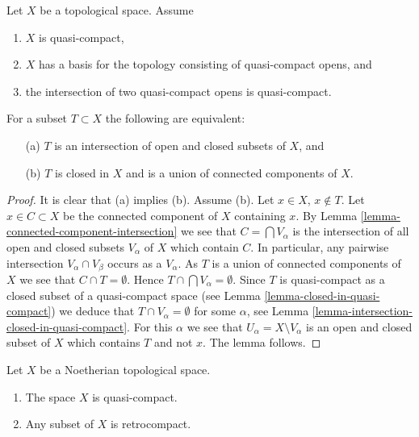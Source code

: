 \begin{lemma}
\label{lemma-closed-union-connected-components}
Let $X$ be a topological space.
Assume
\begin{enumerate}
\item $X$ is quasi-compact,
\item $X$ has a basis for the topology consisting of quasi-compact opens, and
\item the intersection of two quasi-compact opens is quasi-compact.
\end{enumerate}
For a subset $T \subset X$ the following are equivalent:
\begin{enumerate}
\item[(a)] $T$ is an intersection of open and closed subsets of $X$, and
\item[(b)] $T$ is closed in $X$ and is a union of connected components of $X$.
\end{enumerate}
\end{lemma}

\begin{proof}
It is clear that (a) implies (b).
Assume (b). Let $x \in X$, $x \not \in T$. Let $x \in C \subset X$
be the connected component of $X$ containing $x$. By
Lemma \ref{lemma-connected-component-intersection}
we see that $C = \bigcap V_\alpha$ is the intersection of all open and
closed subsets $V_\alpha$ of $X$ which contain $C$.
In particular, any pairwise intersection $V_\alpha \cap V_\beta$
occurs as a $V_\alpha$.
As $T$ is a union of connected components
of $X$ we see that $C \cap T = \emptyset$. Hence
$T \cap \bigcap V_\alpha = \emptyset$. Since $T$ is quasi-compact as a
closed subset of a quasi-compact space (see
Lemma \ref{lemma-closed-in-quasi-compact})
we deduce that $T \cap V_\alpha = \emptyset$ for some $\alpha$, see
Lemma \ref{lemma-intersection-closed-in-quasi-compact}.
For this $\alpha$ we see that $U_\alpha = X \setminus V_\alpha$
is an open and closed subset of $X$ which contains $T$ and not $x$.
The lemma follows.
\end{proof}

\begin{lemma}
\label{lemma-Noetherian-quasi-compact}
Let $X$ be a Noetherian topological space.
\begin{enumerate}
\item The space $X$ is quasi-compact.
\item Any subset of $X$ is retrocompact.
\end{enumerate}
\end{lemma}

